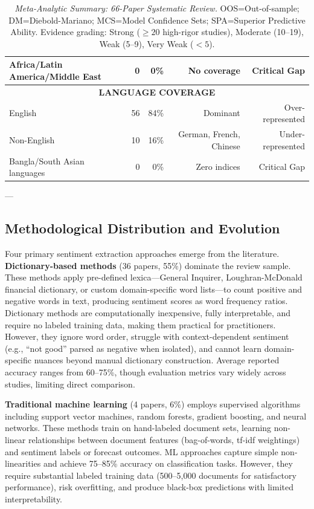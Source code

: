 \documentclass[11pt]{article}
\begin{document}
\begin{table}[H]
\begin{tabular}{|l|r|r|r|r|}
Africa/Latin America/Middle East & 0 & 0\% & No coverage & Critical Gap \\
\hline
\multicolumn{5}{|c|}{\textbf{LANGUAGE COVERAGE}} \\
\hline
English & 56 & 84\% & Dominant & Over-represented \\
Non-English & 10 & 16\% & German, French, Chinese & Under-represented \\
Bangla/South Asian languages & 0 & 0\% & Zero indices & Critical Gap \\
\hline
\end{tabular}
\caption{\textit{Meta-Analytic Summary: 66-Paper Systematic Review.} OOS=Out-of-sample; DM=Diebold-Mariano; MCS=Model Confidence Sets; SPA=Superior Predictive Ability. Evidence grading: Strong ($\geq 20$ high-rigor studies), Moderate (10--19), Weak (5--9), Very Weak ($<5$).}
\label{tab:metasummary}
\end{table}

---

\subsection{Methodological Distribution and Evolution}

Four primary sentiment extraction approaches emerge from the literature. \textbf{Dictionary-based methods} (36 papers, 55\%) dominate the review sample. These methods apply pre-defined lexica---General Inquirer, Loughran-McDonald financial dictionary, or custom domain-specific word lists---to count positive and negative words in text, producing sentiment scores as word frequency ratios. Dictionary methods are computationally inexpensive, fully interpretable, and require no labeled training data, making them practical for practitioners. However, they ignore word order, struggle with context-dependent sentiment (e.g., ``not good'' parsed as negative when isolated), and cannot learn domain-specific nuances beyond manual dictionary construction. Average reported accuracy ranges from 60--75\%, though evaluation metrics vary widely across studies, limiting direct comparison.

\textbf{Traditional machine learning} (4 papers, 6\%) employs supervised algorithms including support vector machines, random forests, gradient boosting, and neural networks. These methods train on hand-labeled document sets, learning non-linear relationships between document features (bag-of-words, tf-idf weightings) and sentiment labels or forecast outcomes. ML approaches capture simple non-linearities and achieve 75--85\% accuracy on classification tasks. However, they require substantial labeled training data (500--5,000 documents for satisfactory performance), risk overfitting, and produce black-box predictions with limited interpretability.
\end{document}
